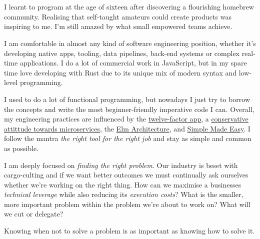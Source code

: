 \documentclass[10pt,a4paper]{article}
\begin{document}
\vspace{-1.3em}  %
\begin{multicols}{2}  %
\\
\\
\noindent I learnt to program at the age of sixteen after discovering a flourishing homebrew community. Realising that self-taught amateurs could create products was inspiring to me. I'm still amazed by what small empowered teams achieve.\newline

\noindent I am comfortable in almost any kind of software engineering position, whether it's developing native apps, tooling, data pipelines, back-end systems or complex real-time applications. I do a lot of commercial work in JavaScript, but in my spare time love developing with Rust due to its unique mix of modern syntax and low-level programming.\newline

\noindent I used to do a lot of functional programming, but nowadays I just try to borrow the concepts and write the most beginner-friendly imperative code I can. Overall, my engineering practices are influenced by the \href{http://12factor.net}{twelve-factor app}, a \href{https://www.tigerteam.dk/2014/micro-services-its-not-only-the-size-that-matters-its-also-how-you-use-them-part-2/}{conservative attittude towards microservices}, the \href{https://github.com/evancz/elm-architecture-tutorial/}{Elm Architecture}, and \href{http://infoq.com/presentations/Simple-Made-Easy}{Simple Made Easy}. I follow the mantra \emph{the right tool for the right job} and stay as simple and common as possible.\newline

\noindent I am deeply focused on \emph{finding the right problem}. Our industry is beset with cargo-culting and if we want better outcomes we must continually ask ourselves whether we're working on the right thing. How can we maximise a businesses \emph{technical leverage} while also reducing its \emph{execution costs}? What is the smaller, more important problem within the problem we're about to work on? What will we cut or delegate?

\noindent Knowing when not to solve a problem is as important as knowing how to solve it.

\end{multicols}

\spacedhrule{1.5em}{-0.4em}

\end{document}
